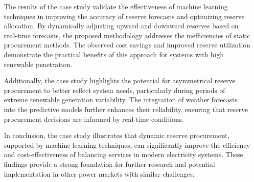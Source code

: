 The results of the case study validate the effectiveness of machine learning techniques in improving the accuracy of reserve forecasts and optimizing reserve allocation. By dynamically adjusting upward and downward reserves based on real-time forecasts, the proposed methodology addresses the inefficiencies of static procurement methods. The observed cost savings and improved reserve utilization demonstrate the practical benefits of this approach for systems with high renewable penetration.

Additionally, the case study highlights the potential for asymmetrical reserve procurement to better reflect system needs, particularly during periods of extreme renewable generation variability. The integration of weather forecasts into the predictive models further enhances their reliability, ensuring that reserve procurement decisions are informed by real-time conditions.

In conclusion, the case study illustrates that dynamic reserve procurement, supported by machine learning techniques, can significantly improve the efficiency and cost-effectiveness of balancing services in modern electricity systems. These findings provide a strong foundation for further research and potential implementation in other power markets with similar challenges.
